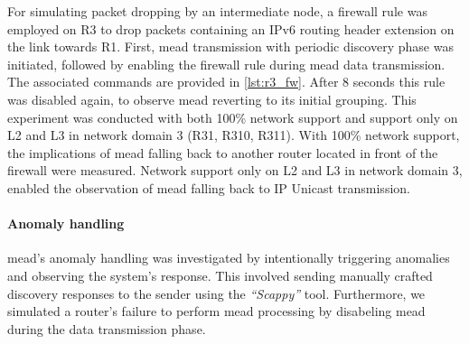 For simulating packet dropping by an intermediate node, a firewall rule was
    employed on R3 to drop packets containing an IPv6 routing header extension
    on the link towards R1.
First, \gls{mead} transmission with periodic discovery phase was initiated,
    followed by enabling the firewall rule during \gls{mead} data transmission.
The associated commands are provided in \autoref{lst:r3_fw}.
After 8 seconds this rule was disabled again, to observe \gls{mead} reverting to
    its initial grouping.
This experiment was conducted with both 100\% network support and support only
    on L2 and L3 in network domain 3 (R31, R310, R311).
With 100\% network support, the implications of \gls{mead} falling back to
    another router located in front of the firewall were measured.
Network support only on L2 and L3 in network domain 3, enabled the
    observation of \gls{mead} falling back to IP Unicast transmission.

\paragraph{Anomaly handling} %
\label{par:Anomaly handling}
\gls{mead}'s anomaly handling was investigated by intentionally triggering
    anomalies and observing the system's response.
This involved sending manually crafted discovery responses to the sender using
    the \textit{``Scappy''} tool.
Furthermore, we simulated a router's failure to perform \gls{mead} processing by
    disabeling \gls{mead} during the data transmission phase.
